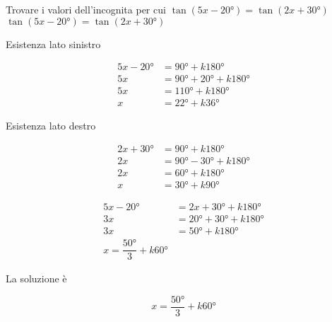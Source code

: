 \begin{exercise}
	Trovare i valori dell'incognita per cui $\tan(5x-\ang{20;;})=\tan(2x+\ang{30;;})$
	\tcblower
	$\tan(5x-\ang{20;;})=\tan(2x+\ang{30;;})$
	
	Esistenza lato sinistro
	
		\begin{align*}
		5x-\ang{20;;}&=\ang{90;;}+k\ang{180;;}\\
		5x&=\ang{90;;}+\ang{20;;}+k\ang{180;;}\\
		5x&=\ang{110;;}+k\ang{180;;}\\
	 x&=\ang{22;;}+k\ang{36;;}
		\end{align*}
	
	Esistenza lato destro
	
	\begin{align*}
	2x+\ang{30;;}&=\ang{90;;}+k\ang{180;;}\\
	2x&=\ang{90;;}-\ang{30;;}+k\ang{180;;}\\
	2x&=\ang{60;;}+k\ang{180;;}\\
	x&=\ang{30;;}+k\ang{90;;}
	\end{align*}
	
	
	\begin{align*}
	5x-\ang{20;;}&=2x+\ang{30;;}+k\ang{180;;}\\
	3x&=\ang{20;;}+\ang{30;;}+k\ang{180;;}\\
	3x&=\ang{50;;}+k\ang{180;;}\\
	x =\dfrac{\ang{50;;}}{3}+k\ang{60;;}
	\end{align*}
	
	La soluzione è
	
\[x =\dfrac{\ang{50;;}}{3}+k\ang{60;;}\]
\end{exercise}
